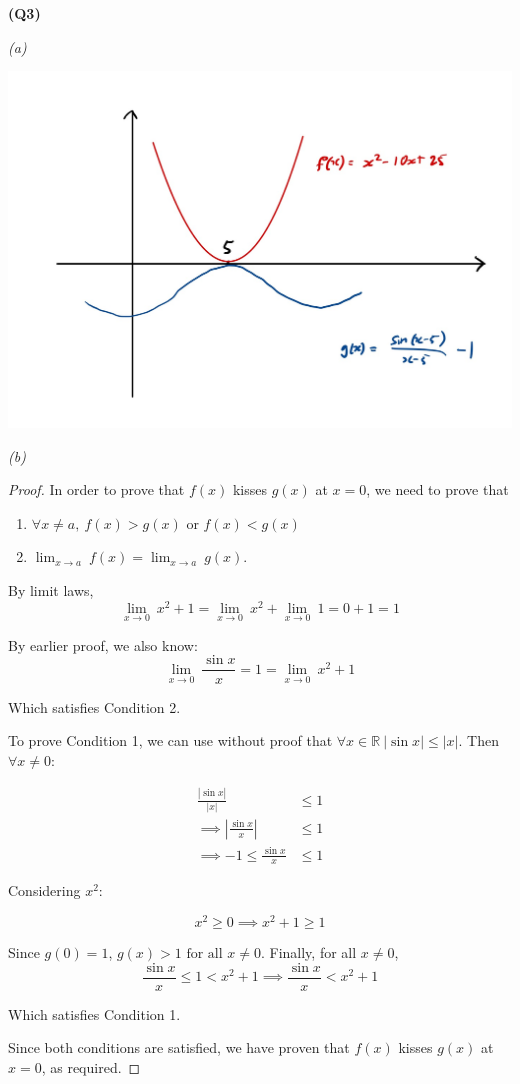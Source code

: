 \documentclass[12pt, a4paper]{article}
\newcommand{\R}{\mathbb{R}}
\newcommand{\displim}[1]{\displaystyle{\lim_{#1}\:}}
\begin{document}
\textbf{(Q3)}

\textit{(a)}

\includegraphics[width=\textwidth]{q3.jpg}

\newpage

\textit{(b)}

\begin{proof}
    In order to prove that $f(x)$ kisses $g(x)$ at $x = 0$, we need to prove that

    \begin{enumerate}
        \item $\forall x \neq a, \: f(x) > g(x)$ or $f(x) < g(x)$
        \item $\displim{x \to a} f(x) = \displim{x \to a} g(x)$.
    \end{enumerate}

    By limit laws,
    \[
        \displim{x \to 0} x^2 + 1 = \displim{x \to 0} x^2 + \displim{x \to 0} 1
        = 0 + 1 = 1
    \]

    By earlier proof, we also know:
    \[
        \displim{x \to 0} \frac{\sin x}{x} = 1 = \displim{x \to 0} x^2 + 1
    \]

    Which satisfies Condition 2.

    To prove Condition 1, we can use without proof that $\forall x \in \R\: |\sin x| \leq |x|$.
    Then $\forall x \neq 0$:

    \begin{align*}
        \frac{|\sin x|}{|x|} & \leq 1\\
        \implies \left|\frac{\sin x}{x}\right| & \leq 1\\
        \implies -1 \leq \frac{\sin x}{x} & \leq 1
    \end{align*}

    Considering $x^2$:

    \[
        x^2 \geq 0 \implies x^2 + 1 \geq 1
    \]

    Since $g(0) = 1$, $g(x) > 1 \text{ for all } x \neq 0$. Finally, for all $x \neq 0$,
    \[
        \frac{\sin x}{x} \leq 1 < x^2 + 1 \implies \frac{\sin x}{x} < x^2 + 1
    \]

    Which satisfies Condition 1.

    Since both conditions are satisfied, we have proven that $f(x)$ kisses $g(x)$ at $x = 0$, as required.
\end{proof}
\end{document}
